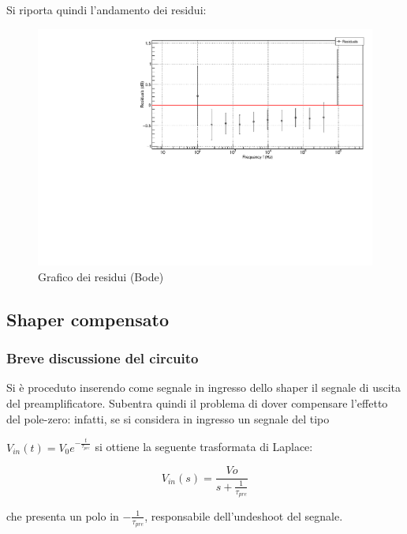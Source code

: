 \documentclass{article}
\begin{document}
Si riporta quindi l'andamento dei residui:
\begin{center}
    \begin{figure}[H]
    \centering
    \includegraphics[scale=0.3875, angle=0]{bodeshaperresidui_no_pz.pdf}
    \caption{ Grafico dei residui (Bode)}
    \label{fig:bodeshaperresidui_no_pz}
    \end{figure}
\end{center}

\subsection{Shaper compensato}

\subsubsection{Breve discussione del circuito}

Si è proceduto inserendo come segnale in ingresso dello shaper il segnale di uscita del preamplificatore. Subentra quindi il problema 
di dover compensare l'effetto del pole-zero: infatti, se si considera in ingresso un segnale del tipo 

$V_{in}(t)=V_0 e^{-\frac{t}{\tau_{pre}}}$ 
si ottiene la seguente trasformata di Laplace:


\begin{equation}
    V_{in}(s)=\frac{Vo}{s+\frac{1}{\tau_{pre}}}
\end{equation}


che presenta un polo in $-\frac{1}{\tau_{pre}} $,  responsabile dell’undeshoot del segnale.
\end{document}

